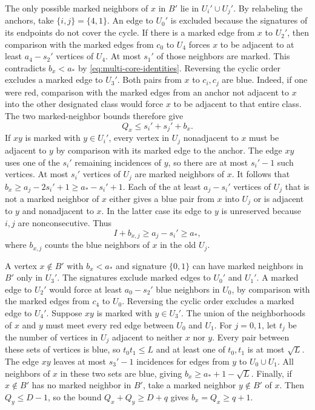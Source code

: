 \documentclass[preprint,11pt,numbers]{elsarticle-arxiv}
\numberwithin{equation}{section}
\theoremstyle{definition}
\begin{document}
The only possible marked neighbors of $x$ in $B'$ lie in
$U_i'\cup U_j'$. By relabeling the anchors, take
$\{i,j\}=\{4,1\}$. An edge to $U_0'$ is excluded because the
signatures of its endpoints do not cover the cycle. If there is
a marked edge from $x$ to $U_2'$, then comparison with the marked
edges from $c_0$ to $U_4$ forces $x$ to be adjacent to at least
$a_4-s_2'$ vertices of $U_4$. At most $s_1'$ of those neighbors
are marked. This contradicts $b_x<a_*$ by
\eqref{eq:multi-core-identities}. Reversing the cyclic order
excludes a marked edge to $U_3'$. Both pairs from $x$ to $c_i,c_j$
are blue. Indeed, if one were red, comparison with the marked
edges from an anchor not adjacent to $x$ into the other designated
class would force $x$ to be adjacent to that entire class.
The two marked-neighbor bounds therefore give
\begin{equation}\label{eq:multi-low-blue-outside}
 Q_x\le s_i'+s_j'+b_x.
\end{equation}
If $xy$ is marked with $y\in U_i'$, every vertex in $U_j$
nonadjacent to $x$ must be adjacent to $y$ by comparison with its
marked edge to the anchor. The edge $xy$ uses one of the $s_i'$
remaining incidences of $y$, so there are at most $s_i'-1$ such
vertices. At most $s_i'$ vertices of $U_j$ are marked neighbors
of $x$. It follows that $b_x\ge a_j-2s_i'+1\ge a_*-s_i'+1$.
Each of the at least $a_j-s_i'$ vertices of $U_j$ that is not a
marked neighbor of $x$ either gives a blue pair from $x$ into
$U_j$ or is adjacent to $y$ and nonadjacent to $x$. In the latter
case its edge to $y$ is unreserved because $i,j$ are nonconsecutive.
Thus
\begin{equation}\label{eq:multi-rectangle}
 I+b_{x,j}\ge a_j-s_i'\ge a_*,
\end{equation}
where $b_{x,j}$ counts the blue neighbors of $x$ in the old $U_j$.

A vertex $x\notin B'$ with $b_x<a_*$ and signature $\{0,1\}$
can have marked neighbors in $B'$ only in $U_3'$. The signatures
exclude marked edges to $U_0'$ and $U_1'$. A marked edge to $U_2'$
would force at least $a_0-s_2'$ blue neighbors in $U_0$, by
comparison with the marked edges from $c_4$ to $U_0$. Reversing
the cyclic order excludes a marked edge to $U_4'$. Suppose $xy$
is marked with $y\in U_3'$. The union of the neighborhoods of
$x$ and $y$ must meet every red edge between $U_0$ and $U_1$.
For $j=0,1$, let $t_j$ be the number of vertices in $U_j$
adjacent to neither $x$ nor $y$. Every pair between these sets
of vertices is blue, so $t_0t_1\le L$ and at least one of
$t_0,t_1$ is at most $\sqrt L$. The edge $xy$ leaves at most
$s_3'-1$ incidences for edges from $y$ to $U_0\cup U_1$. All
neighbors of $x$ in these two sets are blue, giving
$b_x\ge a_*+1-\sqrt L$. Finally, if $x\notin B'$ has no marked
neighbor in $B'$, take a marked neighbor $y\notin B'$ of $x$.
Then $Q_y\le D-1$, so the bound $Q_x+Q_y\ge D+q$ gives
$b_x=Q_x\ge q+1$.
\end{document}
